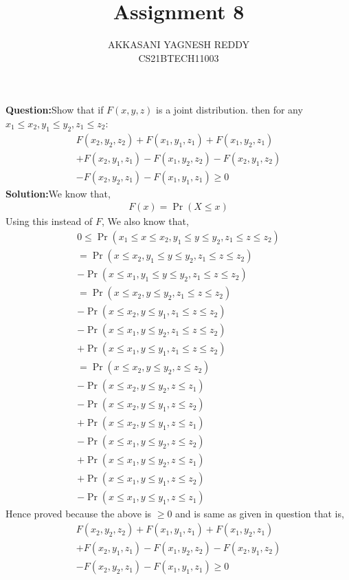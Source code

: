 \documentclass[journal,12pt,twocolumn]{IEEEtran}
\title{Assignment 8}
\author{AKKASANI YAGNESH REDDY \\
     CS21BTECH11003 \\}
\providecommand{\pr}[1]{\ensuremath{\Pr\left(#1\right)}}
\begin{document}
     \maketitle
     \textbf{Question:}Show that if $F(x, y, z)$ is a joint distribution. then for any $x_{1}\leq x_{2},y_{1}\leq y_{2},z_{1}\leq z_{2}$:
     \begin{align}
         F(x_{2},y_{2},z_{2})+F(x_{1},y_{1},z_{1})+F(x_{1},y_{2},z_{1})\nonumber\\+F(x_{2},y_{1},z_{1})-F(x_{1},y_{2},z_{2})-F(x_{2},y_{1},z_{2})\nonumber\\-F(x_{2},y_{2},z_{1})-F(x_{1},y_{1},z_{1})\geq 0
         \end{align}
        \textbf{Solution:}We know that, 
    \begin{align}
        F(x)=\pr{X\leq x}
    \end{align}
    Using this instead of $F$,
    We also know that,
    \begin{align}
        0 \leq \pr{x_{1}\leq x\leq x_{2},y_{1}\leq y\leq y_{2},z_{1}\leq z\leq z_{2}}\\
       =\pr{x\leq x_{2},y_{1}\leq y\leq y_{2},z_{1}\leq z\leq z_{2}\nonumber} \\
        -\pr{x\leq x_{1},y_{1}\leq y\leq y_{2},z_{1}\leq z\leq z_{2}}\\
        =\pr{x\leq x_{2},y\leq y_{2},z_{1}\leq z\leq z_{2}}\nonumber\\
        -\pr{x\leq x_{2},y\leq y_{1},z_{1}\leq z\leq z_{2}}\nonumber\\
        -\pr{x\leq x_{1},y\leq y_{2},z_{1}\leq z\leq z_{2}}\nonumber\\
        +\pr{x\leq x_{1},y\leq y_{1},z_{1}\leq z\leq z_{2}}\\
        =\pr{x\leq x_{2},y\leq y_{2},z\leq z_{2}}\nonumber\\
        -\pr{x\leq x_{2},y\leq y_{2},z\leq z_{1}}\nonumber\\
        -\pr{x\leq x_{2},y\leq y_{1},z\leq z_{2}}\nonumber\\
        +\pr{x\leq x_{2},y\leq y_{1},z\leq z_{1}}\nonumber\\
        -\pr{x\leq x_{1},y\leq y_{2},z\leq z_{2}}\nonumber\\
        +\pr{x\leq x_{1},y\leq y_{2},z\leq z_{1}}\nonumber\\
        +\pr{x\leq x_{1},y\leq y_{1},z\leq z_{2}}\nonumber\\
        -\pr{x\leq x_{1},y\leq y_{1},z\leq z_{1}}
        \end{align}
        Hence proved because the above is $\geq0$ and is same as given in question that is,
         \begin{align}
         F(x_{2},y_{2},z_{2})+F(x_{1},y_{1},z_{1})+F(x_{1},y_{2},z_{1})\nonumber\\+F(x_{2},y_{1},z_{1})-F(x_{1},y_{2},z_{2})-F(x_{2},y_{1},z_{2})\nonumber\\-F(x_{2},y_{2},z_{1})-F(x_{1},y_{1},z_{1})\geq 0
         \end{align}
     
\end{document}
